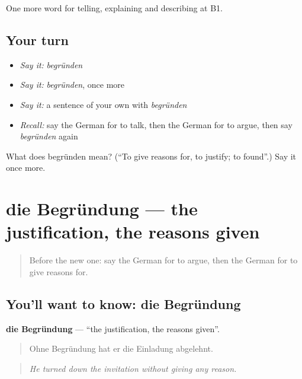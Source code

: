 \begin{grammarlens}[title={What you've built}]
One more word for telling, explaining and describing at B1.
\end{grammarlens}

\subsection*{Your turn}
\begin{itemize}
\raggedright
  \item \emph{Say it:} \emph{begründen}
  \item \emph{Say it:} \emph{begründen}, once more
  \item \emph{Say it:} a sentence of your own with \emph{begründen}
  \item \emph{Recall:} say the German for to talk, then the German for to argue, then say \emph{begründen} again
\end{itemize}

\begin{tcolorbox}[breakable,colback=teal!4,colframe=teal!35!black,title={Before you move on}]
What does begründen mean? (\textquotedblleft{}To give reasons for, to justify; to found\textquotedblright{}.) Say it once more.
\end{tcolorbox}
\section[die Begründung]{die Begründung — the justification, the reasons given}

\label{lesson:GE-C332-begruendung}



\begin{quote}
Before the new one: say the German for to argue, then the German for to give reasons for.
\end{quote}

\subsection*{You'll want to know: die Begründung}
\textbf{die Begründung} — \textquotedblleft{}the justification, the reasons given\textquotedblright{}.

\begin{quote}
Ohne Begründung hat er die Einladung abgelehnt.
\end{quote}

\begin{quote}
\emph{He turned down the invitation without giving any reason.}
\end{quote}

